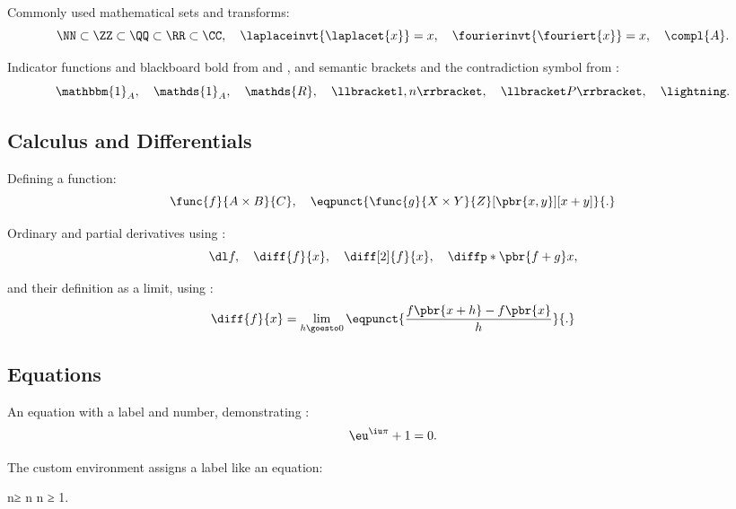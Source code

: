 Commonly used mathematical sets and transforms:
\begin{equation*}
  \NN \subset \ZZ \subset \QQ \subset \RR \subset \CC,
  \quad \laplaceinvt{\laplacet{x}} = x,
  \quad \fourierinvt{\fouriert{x}} = x,
  \quad \compl{A}.
\end{equation*}

Indicator functions and blackboard bold from  and , and semantic brackets and the contradiction symbol from :
\begin{equation*}
  \mathbbm{1}_A,
  \quad \mathds{1}_A,
  \quad \mathds{R},
  \quad \llbracket 1, n \rrbracket,
  \quad \llbracket P \rrbracket,
  \quad \lightning.
\end{equation*}

\subsection{Calculus and Differentials}

Defining a function:
\begin{equation*}
  \func{f}{A \times B}{C},
  \quad \eqpunct{\func{g}{X \times Y}{Z}[\pbr{x, y}][x + y]}{.}
\end{equation*}

Ordinary and partial derivatives using :
\begin{equation*}
  \dl f,
  \quad \diff{f}{x},
  \quad \diff[2]{f}{x},
  \quad \diffp*{\pbr{f + g}}{x},
\end{equation*}

\noindent
and their definition as a limit, using :
\begin{equation*}
  \diff{f}{x} = \lim_{h \goesto 0} \eqpunct{\frac{f\pbr{x + h} - f\pbr{x}}{h}}{.}
\end{equation*}

\subsection{Equations}

An equation with a label and number, demonstrating :
\begin{equation}\label{eq:euler}
  \eu^{\iu\pi} + 1 = 0.
\end{equation}

The custom  environment assigns a label like an equation:
\begin{inequality}\label{ineq:example}
  n\sq ≥ n
  \quad {} n ≥ 1.
\end{inequality}

